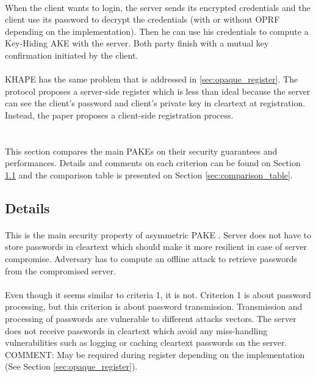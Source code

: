 ﻿\documentclass[../report.tex]{subfiles}
\begin{document}
\paragraph{}
When the client wants to login, the server sends its encrypted credentials and the client use its password to decrypt the credentials (with or without OPRF depending on the implementation). Then he can use his credentials to compute a Key-Hiding AKE with the server.
Both party finish with a mutual key confirmation initiated by the client.
\paragraph{}
KHAPE has the same problem that is addressed in \ref{sec:opaque_register}.
The protocol proposes a server-side register which is less than ideal because the server can see the client's password and client's private key in cleartext at registration.
Instead, the paper proposes a client-side registration process.
\section{}
This section compares the main PAKEs on their security guarantees and performances. Details and comments on each criterion can be found on Section \ref{sec:comparison_details} and the comparison table is presented on Section \ref{sec:comparison_table}.
 
\subsection{Details} \label{sec:comparison_details}
\paragraph{}
This is the main security property of asymmetric PAKE \cite{aPAKE_Formalized}. Server does not have to store passwords in cleartext which should make it more resilient in case of server compromise. Adversary has to compute an offline attack to retrieve passwords from the compromised server.
\paragraph{}
Even though it seems similar to criteria 1, it is not. Criterion 1 is about password processing, but this criterion is about password transmission. Transmission and processing of passwords are vulnerable to different attacks vectors.
The server does not receive passwords in cleartext which avoid any miss-handling vulnerabilities such as logging or caching cleartext passwords on the server.
COMMENT: May be required during register depending on the implementation (See Section \ref{sec:opaque_register}).
\end{document}
